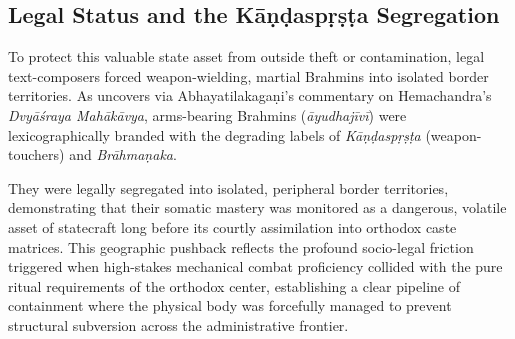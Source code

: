 \documentclass[11pt,twoside,letterpaper]{article}
\begin{document}
\subsection{Legal Status and the Kāṇḍaspṛṣṭa Segregation}
To protect this valuable state asset from outside theft or contamination, legal text-composers forced weapon-wielding, martial Brahmins into isolated border territories. As \citet{Sandesara1948} uncovers via Abhayatilakagaṇi’s commentary on Hemachandra’s \textit{Dvyāśraya Mahākāvya}, arms-bearing Brahmins (\textit{āyudhajīvī}) were lexicographically branded with the degrading labels of \textit{Kāṇḍaspṛṣṭa} (weapon-touchers) and \textit{Brāhmaṇaka}. 

They were legally segregated into isolated, peripheral border territories, demonstrating that their somatic mastery was monitored as a dangerous, volatile asset of statecraft long before its courtly assimilation into orthodox caste matrices. This geographic pushback reflects the profound socio-legal friction triggered when high-stakes mechanical combat proficiency collided with the pure ritual requirements of the orthodox center, establishing a clear pipeline of containment where the physical body was forcefully managed to prevent structural subversion across the administrative frontier.
\end{document}
